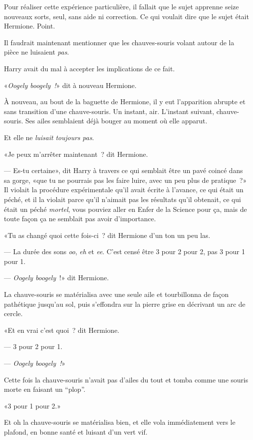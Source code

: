 Pour réaliser cette expérience particulière, il fallait que le sujet apprenne seize nouveaux sorts, seul, sans aide ni correction. Ce qui voulait dire que le sujet était Hermione. Point.

Il faudrait maintenant mentionner que les chauves-souris volant autour de la pièce ne luisaient \emph{pas}.

Harry avait du mal à accepter les implications de ce fait.

«\emph{Oogely boogely~!}» dit à nouveau Hermione.

À nouveau, au bout de la baguette de Hermione, il y eut l'apparition abrupte et sans transition d'une chauve-souris. Un instant, air. L'instant suivant, chauve-souris. Ses ailes semblaient déjà bouger au moment où elle apparut.

Et elle ne \emph{luisait toujours pas}.

«Je peux m'arrêter maintenant~? dit Hermione.

--- Es-tu certaine», dit Harry à travers ce qui semblait être un pavé coincé dans sa gorge, «que tu ne pourrais pas les faire luire, avec un peu plus de pratique~?» Il violait la procédure expérimentale qu'il avait écrite à l'avance, ce qui était un péché, et il la violait parce qu'il n'aimait pas les résultats qu'il obtenait, ce qui était un péché \emph{mortel}, vous pouviez aller en Enfer de la Science pour ça, mais de toute façon ça ne semblait pas avoir d'importance.

«Tu as changé quoi cette fois-ci~? dit Hermione d'un ton un peu las.

--- La durée des sons \emph{oo}, \emph{eh} et \emph{ee}. C'est censé être 3 pour 2 pour 2, pas 3 pour 1 pour 1.

--- \emph{Oogely boogely}~!» dit Hermione.

La chauve-souris se matérialisa avec une seule aile et tourbillonna de façon pathétique jusqu'au sol, puis s'effondra sur la pierre grise en décrivant un arc de cercle.

«Et en vrai c'est quoi~? dit Hermione.

--- 3 pour 2 pour 1.

--- \emph{Oogely boogely~!}»

Cette fois la chauve-souris n'avait pas d'ailes du tout et tomba comme une souris morte en faisant un “plop”.

«3 pour 1 pour 2.»

Et oh la chauve-souris se matérialisa bien, et elle vola immédiatement vers le plafond, en bonne santé et luisant d'un vert vif.

